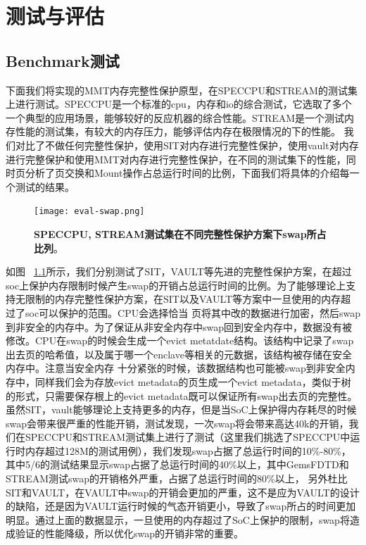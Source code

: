 \chapter{测试与评估}

\section{Benchmark测试}
下面我们将实现的MMT内存完整性保护原型，在SPECCPU和STREAM的测试集上进行测试。SPECCPU是一个标准的cpu，内存和io的综合测试，它选取了多个一个典型的应用场景，能够较好的反应机器的综合性能。STREAM是一个测试内存性能的测试集，有较大的内存压力，能够评估内存在极限情况的下的性能。
我们对比了不做任何完整性保护，使用SIT对内存进行完整性保护，使用vault对内存进行完整保护和使用MMT对内存进行完整性保护，在不同的测试集下的性能，同时页分析了页交换和Mount操作占总运行时间的比例，下面我们将具体的介绍每一个测试的结果。

\begin{figure}[!htp]
    \centering
    \texttt{[image: eval-swap.png]}
    \caption{\textbf{SPECCPU, STREAM测试集在不同完整性保护方案下swap所占比列}。}
   \label{fig:eval-swap}
\end{figure}
如图 ~\ref{fig:eval-swap}所示，我们分别测试了SIT，VAULT等先进的完整性保护方案，在超过soc上保护内存限制时候产生swap的开销占总运行时间的比例。为了能够理论上支持无限制的内存完整性保护方案，在SIT以及VAULT等方案中一旦使用的内存超过了soc可以保护的范围。CPU会选择恰当
页将其中改的数据进行加密，然后swap到非安全的内存中。为了保证从非安全内存中swap回到安全内存中，数据没有被修改。CPU在swap的时候会生成一个evict metatdate结构。该结构中记录了swap出去页的哈希值，以及属于哪一个enclave等相关的元数据，该结构被存储在安全内存中。注意当安全内存
十分紧张的时候，该数据结构也可能被swap到非安全内存中，同样我们会为存放evict metadata的页生成一个evict metadata，类似于树的形式，只需要保存根上的evict metadata既可以保证所有swap出去页的完整性。虽然SIT，vault能够理论上支持更多的内存，但是当SoC上保护得内存耗尽的时候
swap会带来很严重的性能开销，测试发现，一次swap将会带来高达40k的开销，我们在SPECCPU和STREAM测试集上进行了测试（这里我们挑选了SPECCPU中运行时内存超过128M的测试用例），我们发现swap占据了总运行时间的10\%-80\%，其中5/6的测试结果显示swap占据了总运行时间的40\%以上，其中GemsFDTD和STREAM测试swap的开销格外严重，占据了总运行时间的80\%以上，
另外杜比SIT和VAULT，在VAULT中swap的开销会更加的严重，这不是应为VAULT的设计的缺陷，还是因为VAULT运行时候的气态开销更小，导致了swap所占的时间更加明显。通过上面的数据显示，一旦使用的内存超过了SoC上保护的限制，swap将造成验证的性能降级，所以优化swap的开销非常的重要。

